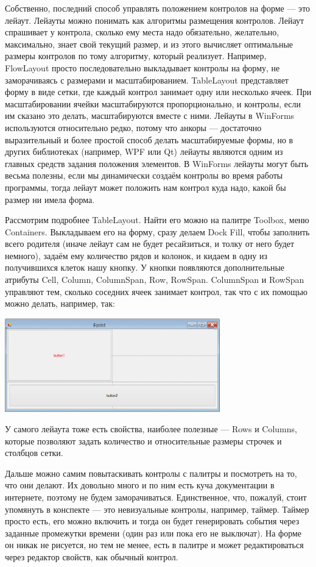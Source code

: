 \documentclass{../../text-style}
\begin{document}
Собственно, последний способ управлять положением контролов на форме --- это лейаут. Лейауты можно понимать как алгоритмы размещения контролов. Лейаут спрашивает у контрола, сколько ему места надо обязательно, желательно, максимально, знает свой текущий размер, и из этого вычисляет оптимальные размеры контролов по тому алгоритму, который реализует. Например, FlowLayout просто последовательно выкладывает контролы на форму, не заморачиваясь с размерами и масштабированием. TableLayout представляет форму в виде сетки, где каждый контрол занимает одну или несколько ячеек. При масштабировании ячейки масштабируются пропорционально, и контролы, если им сказано это делать, масштабируются вместе с ними. Лейауты в WinForms используются относительно редко, потому что анкоры --- достаточно выразительный и более простой способ делать масштабируемые формы, но в других библиотеках (например, WPF или Qt) лейауты являются одним из главных средств задания положения элементов. В WinForms лейауты могут быть весьма полезны, если мы динамически создаём контролы во время работы программы, тогда лейаут может положить нам контрол куда надо, какой бы размер ни имела форма.

Рассмотрим подробнее TableLayout. Найти его можно на палитре Toolbox, меню Containers. Выкладываем его на форму, сразу делаем Dock Fill, чтобы заполнить всего родителя (иначе лейаут сам не будет ресайзиться, и толку от него будет немного), задаём ему количество рядов и колонок, и кидаем в одну из получившихся клеток нашу кнопку. У кнопки появляются дополнительные атрибуты Cell, Column, ColumnSpan, Row, RowSpan. ColumnSpan и RowSpan управляют тем, сколько соседних ячеек занимает контрол, так что с их помощью можно делать, например, так:

\begin{center}
    \includegraphics[width=0.7\textwidth]{gridLayout.png}
\end{center}

У самого лейаута тоже есть свойства, наиболее полезные --- Rows и Columns, которые позволяют задать количество и относительные размеры строчек и столбцов сетки.

Дальше можно самим повытаскивать контролы с палитры и посмотреть на то, что они делают. Их довольно много и по ним есть куча документации в интернете, поэтому не будем заморачиваться. Единственное, что, пожалуй, стоит упомянуть в конспекте --- это невизуальные контролы, например, таймер. Таймер просто есть, его можно включить и тогда он будет генерировать события через заданные промежутки времени (один раз или пока его не выключат). На форме он никак не рисуется, но тем не менее, есть в палитре и может редактироваться через редактор свойств, как обычный контрол.
\end{document}
